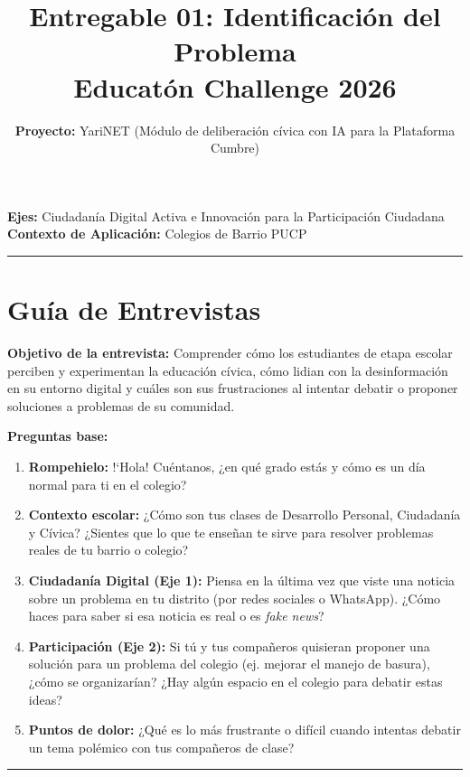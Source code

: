 \documentclass[12pt,a4paper]{article}
\title{\textbf{Entregable 01: Identificación del Problema}\\
Educatón Challenge 2026}
\author{\textbf{Proyecto:} YariNET (Módulo de deliberación cívica con IA para la Plataforma Cumbre)}
\date{}
\begin{document}
\maketitle

\noindent \textbf{Ejes:} Ciudadanía Digital Activa e Innovación para la Participación Ciudadana\\
\textbf{Contexto de Aplicación:} Colegios de Barrio PUCP

\vspace{0.5cm}
\hrule
\vspace{0.5cm}

\section{Guía de Entrevistas}

\textbf{Objetivo de la entrevista:} Comprender cómo los estudiantes de etapa escolar perciben y experimentan la educación cívica, cómo lidian con la desinformación en su entorno digital y cuáles son sus frustraciones al intentar debatir o proponer soluciones a problemas de su comunidad.

\vspace{0.3cm}
\textbf{Preguntas base:}
\begin{enumerate}
    \item \textbf{Rompehielo:} !`Hola! Cuéntanos, ¿en qué grado estás y cómo es un día normal para ti en el colegio?
    \item \textbf{Contexto escolar:} ¿Cómo son tus clases de Desarrollo Personal, Ciudadanía y Cívica? ¿Sientes que lo que te enseñan te sirve para resolver problemas reales de tu barrio o colegio?
    \item \textbf{Ciudadanía Digital (Eje 1):} Piensa en la última vez que viste una noticia sobre un problema en tu distrito (por redes sociales o WhatsApp). ¿Cómo haces para saber si esa noticia es real o es \textit{fake news}? 
    \item \textbf{Participación (Eje 2):} Si tú y tus compañeros quisieran proponer una solución para un problema del colegio (ej. mejorar el manejo de basura), ¿cómo se organizarían? ¿Hay algún espacio en el colegio para debatir estas ideas?
    \item \textbf{Puntos de dolor:} ¿Qué es lo más frustrante o difícil cuando intentas debatir un tema polémico con tus compañeros de clase?
\end{enumerate}

\vspace{0.5cm}
\hrule
\vspace{0.5cm}
\end{document}
